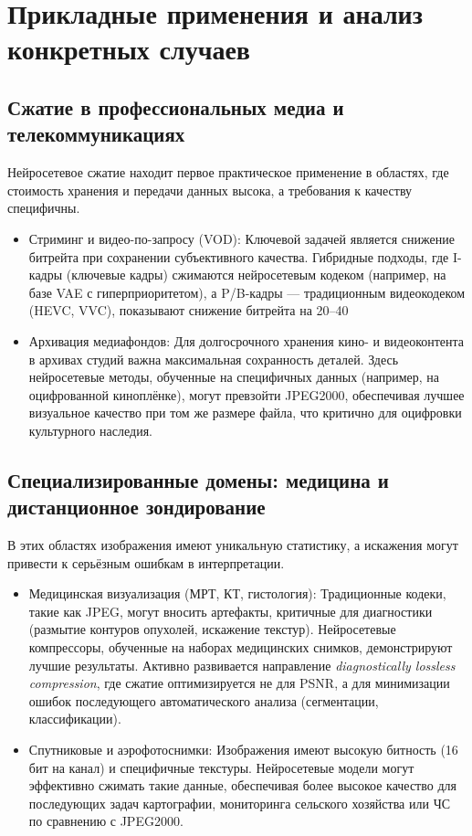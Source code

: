 \section{Прикладные применения и анализ конкретных случаев}
\subsection{Сжатие в профессиональных медиа и телекоммуникациях}
Нейросетевое сжатие находит первое практическое применение в областях, где стоимость хранения и передачи данных высока, а требования к качеству специфичны.

\begin{itemize}
\item Стриминг и видео-по-запросу (VOD): Ключевой задачей является снижение битрейта при сохранении субъективного качества. Гибридные подходы, где I-кадры (ключевые кадры) сжимаются нейросетевым кодеком (например, на базе VAE с гиперприоритетом), а P/B-кадры — традиционным видеокодеком (HEVC, VVC), показывают снижение битрейта на 20–40%
\item Архивация медиафондов: Для долгосрочного хранения кино- и видеоконтента в архивах студий важна максимальная сохранность деталей. Здесь нейросетевые методы, обученные на специфичных данных (например, на оцифрованной киноплёнке), могут превзойти JPEG2000, обеспечивая лучшее визуальное качество при том же размере файла, что критично для оцифровки культурного наследия.
\end{itemize}

\subsection{Специализированные домены: медицина и дистанционное зондирование}
В этих областях изображения имеют уникальную статистику, а искажения могут привести к серьёзным ошибкам в интерпретации.

\begin{itemize}
\item Медицинская визуализация (МРТ, КТ, гистология): Традиционные кодеки, такие как JPEG, могут вносить артефакты, критичные для диагностики (размытие контуров опухолей, искажение текстур). Нейросетевые компрессоры, обученные на наборах медицинских снимков, демонстрируют лучшие результаты. Активно развивается направление \textit{diagnostically lossless compression}, где сжатие оптимизируется не для PSNR, а для минимизации ошибок последующего автоматического анализа (сегментации, классификации).
\item Спутниковые и аэрофотоснимки: Изображения имеют высокую битность (16 бит на канал) и специфичные текстуры. Нейросетевые модели могут эффективно сжимать такие данные, обеспечивая более высокое качество для последующих задач картографии, мониторинга сельского хозяйства или ЧС по сравнению с JPEG2000.
\end{itemize}

